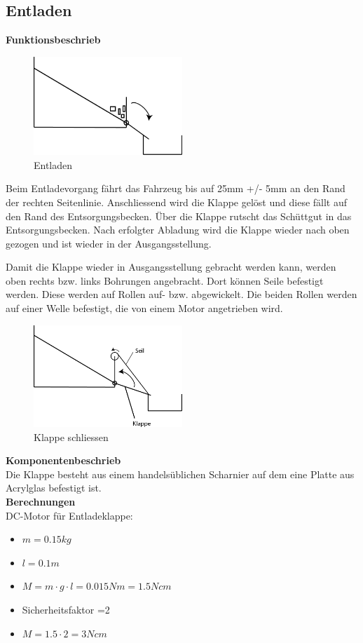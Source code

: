 \subsection{Entladen}

\textbf{Funktionsbeschrieb}\\[0.2cm]
\begin{figure}[H]
\centering
\includegraphics[width=0.5\textwidth]{03_Loesungskonzept/pictures/Entladen_Schraegbehaelter.png}
\caption{Entladen}
\end{figure}\flushleft

Beim Entladevorgang fährt das Fahrzeug bis auf 25mm +/- 5mm an den Rand der rechten Seitenlinie. Anschliessend wird die Klappe gelöst und diese fällt auf den Rand des Entsorgungsbecken. Über die Klappe rutscht das Schüttgut in das Entsorgungsbecken. Nach erfolgter Abladung wird die Klappe wieder nach oben gezogen und ist wieder in der Ausgangsstellung.

Damit die Klappe wieder in Ausgangsstellung gebracht werden kann, werden oben rechts bzw. links Bohrungen angebracht. Dort können Seile befestigt werden. Diese werden auf Rollen auf- bzw. abgewickelt. Die beiden Rollen werden auf einer Welle befestigt, die von einem Motor angetrieben wird.\\[0.2cm]
\begin{figure}[H]
\centering
\includegraphics[width=0.5\textwidth]{03_Loesungskonzept/pictures/Klappe_schliessen.png}
\caption{Klappe schliessen}
\end{figure}\flushleft

\textbf{Komponentenbeschrieb}\\[0.2cm]
Die Klappe besteht aus einem handelsüblichen Scharnier auf dem eine Platte aus Acrylglas befestigt ist. \\[0.2cm]

\textbf{Berechnungen}\\[0.2cm]
DC-Motor für Entladeklappe:
\begin{itemize}
\item $m = 0.15kg$
\item $l = 0.1m$
\item $M = m\cdot g\cdot l = 0.015Nm = 1.5Ncm$
\item Sicherheitsfaktor =2
\item $M = 1.5\cdot 2 = 3Ncm$
\end{itemize} 